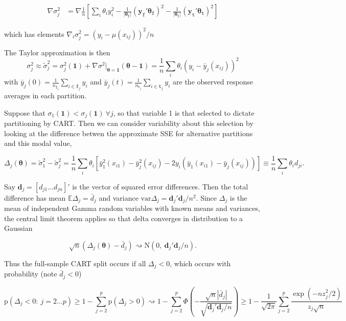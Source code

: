 \documentclass[12pt]{article}
\begin{document}
\begin{align}
\nabla \sigma^2_j & = \nabla  \frac{1}{n}\left[\sum_i \theta_iy_i^2 - \frac{1}{\left|\boldsymbol{\theta}_{\texttt{f}}\right|}\left(\mathbf{y}_{\texttt{f}}'\boldsymbol{\theta}_{\texttt{f}}\right)^2
- \frac{1}{\left|\boldsymbol{\theta}_{\texttt{t}}\right|}\left(\mathbf{y}_{\texttt{t}}'\boldsymbol{\theta}_{\texttt{t}}\right)^2\right]
\end{align}

which has elements $ \nabla_{i} \sigma^2_j = \left(y_i -
\mu(x_{ij})\right)^2/n $

The Taylor approximation is then \[
\sigma^2_j \approx \tilde\sigma^2_j  = \sigma^2_j(\boldsymbol{1}) + \nabla \sigma^2\big |_{\boldsymbol{\theta}=\mathbf{1}} (\boldsymbol{\theta} - \boldsymbol{1}) =  \frac{1}{n}\sum_i \theta_i \left(y_i - \bar{y}_j(x_{ij})\right)^2
\] with
$\bar y_j(0) = \frac{1}{n_{\texttt{f}_j}}\sum_{i \in \texttt{f}_j}y_i$
and
$\bar y_j(t) = \frac{1}{n_{\texttt{t}_j}}\sum_{i \in \texttt{t}_j}y_i$
are the observed response averages in each partition.

    Suppose that
$\sigma_1(\boldsymbol{1}) < \sigma_j(\boldsymbol{1})~\forall j$, so that
variable 1 is that selected to dictate partitioning by CART. Then we can
consider variability about this selection by looking at the difference
betwen the approximate SSE for alternative partitions and this modal
value,

\[
\Delta_j(\boldsymbol{\theta}) = \tilde\sigma_1^2 - \tilde\sigma_j^2 =  \frac{1}{n}\sum_i \theta_i
\left[\bar{y}_1^2(x_{i1})-\bar{y}^2_j(x_{ij}) - 2y_i\left(\bar{y}_1(x_{i1})-\bar{y}_j(x_{ij})\right)\right] \equiv \frac{1}{n}\sum_i \theta_i d_{ji}.
\]

Say $\mathbf{d}_j = [d_{j1}\ldots d_{jn}]'$ is the vector of squared
error differences. Then the total difference has mean
$\mathbb{E}\Delta_j  = \bar{d}_j$ and variance
$\mathrm{var}\Delta_j =  \mathbf{d}_j'\mathbf{d}_j/n^2$. Since
$\Delta_j$ is the mean of independent Gamma random variables with known
means and variances, the central limit theorem applies so that delta
converges in distribution to a Gaussian

\[
\sqrt{n}(\Delta_j(\boldsymbol{\theta}) -\bar{d}_j)\rightsquigarrow \mathrm{N}(0,~\mathbf{d}_j'\mathbf{d}_j/n ).
\]

Thus the full-sample CART split occurs if all $\Delta_j< 0 $, which
occurs with probability (note $\bar d_j < 0$)

\[
\mathrm{p}\left(\Delta_j< 0 :~ j = 2\dots p \right) \geq 1 - \sum_{j=2}^p \mathrm{p}( \Delta_j > 0 )\rightsquigarrow 1 
 - \sum_{j=2}^p \Phi\left( -\frac{\sqrt{n}\left|\bar{d}_j\right|}{\sqrt{\mathbf{d}_j'\mathbf{d}_j/n}}\right) 
 \geq 1 -  \frac{1}{\sqrt{2\pi}} \sum_{j=2}^p \frac{\exp(-n z^2_j/2)}{z_j\sqrt{n}} 
\]
\end{document}
